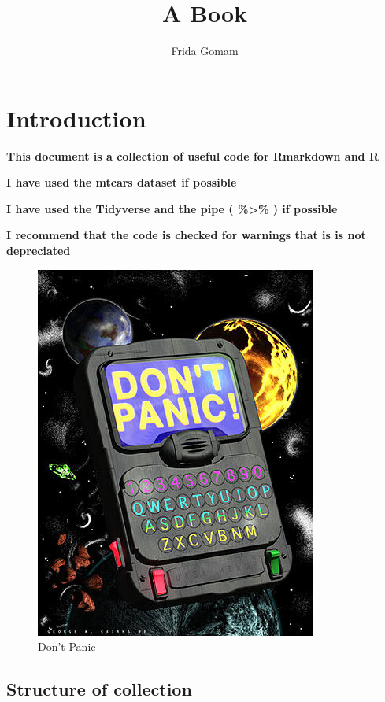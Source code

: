 \documentclass[
]{book}
\title{A Book}
\author{Frida Gomam}
\date{}
\begin{document}
\maketitle

{
\setcounter{tocdepth}{1}
\tableofcontents
}
\hypertarget{introduction}{%
\chapter{Introduction}\label{introduction}}

\textbf{This document is a collection of useful code for Rmarkdown and R}

\textbf{I have used the mtcars dataset if possible}

\textbf{I have used the Tidyverse and the pipe ( \%\textgreater\% ) if possible}

\textbf{I recommend that the code is checked for warnings that is is not depreciated}

\begin{figure}
\centering
\includegraphics{figures/guide.jpg}
\caption{Don't Panic}
\end{figure}

\hypertarget{structure-of-collection}{%
\section{Structure of collection}\label{structure-of-collection}}
\end{document}
